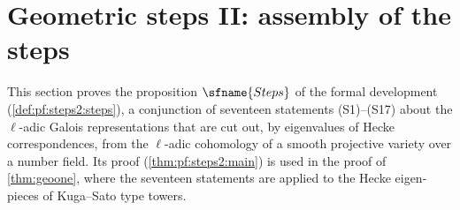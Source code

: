 \section{Geometric steps II: assembly of the steps}\label{sec:pf:steps2}

\providecommand{\stepsiiH}{H^{\bullet}}
\providecommand{\stepsiiPiece}{\mathrm{Piece}}
\providecommand{\stepsiiOw}{\mathcal{O}_{(w)}}
\providecommand{\stepsiiNw}{\mathrm{N}w}
\providecommand{\stepsiiHk}{P^{\mathrm{Hk}}}
\providecommand{\stepsiirt}{P^{\mathrm{rt}}}
\providecommand{\stepsiiop}{\mathrm{op}}
\providecommand{\stepsiitr}{\mathrm{tr}}
\providecommand{\stepsiisp}{\mathrm{sp}}
\providecommand{\stepsiico}{\mathrm{co}}
\providecommand{\stepsiiSec}{\mathrm{Sec}}
\providecommand{\stepsiicyc}{\mathrm{cyc}}
\providecommand{\stepsiiFr}{\mathrm{Fr}}
\providecommand{\stepsiiCR}{\mathrm{CR}}
\providecommand{\stepsiiGood}{\mathrm{Good}}
\providecommand{\stepsiiCong}{\mathrm{Cong}}
\providecommand{\stepsiiES}{\mathrm{ES}}
\providecommand{\stepsiiJ}{\mathrm{J}}
\providecommand{\stepsiiPhi}{\Phi}
\providecommand{\stepsiiHdg}{\mathrm{Hdg}}
\providecommand{\stepsiiW}{\mathrm{Wt}}
\providecommand{\stepsiiRich}{\mathrm{Rich}}
\providecommand{\stepsiiPar}{\mathrm{Par}}
\providecommand{\stepsiitw}{\mathrm{tw}}
\providecommand{\stepsiim}{\mathrm{m}}

This section proves the proposition $\sfname{Steps}$ of the formal development
(\cref{def:pf:steps2:steps}), a conjunction of seventeen statements \textup{(S1)--(S17)} about the
$\ell$-adic Galois representations that are cut out, by eigenvalues of Hecke correspondences, from
the $\ell$-adic cohomology of a smooth projective variety over a number field. Its proof
(\cref{thm:pf:steps2:main}) is used in the proof of \cref{thm:geoone}, where the seventeen
statements are applied to the Hecke eigen-pieces of Kuga--Sato type towers.

